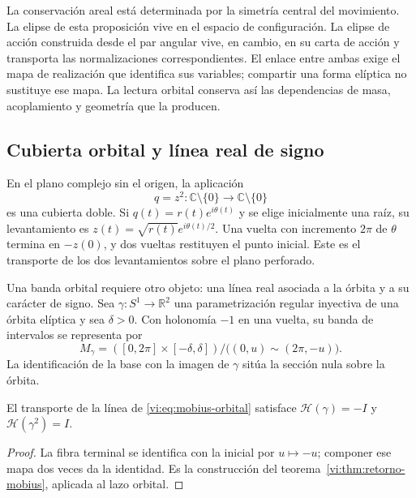 La conservación areal está determinada por la simetría central
del movimiento. La elipse de esta proposición vive en el
espacio de configuración. La elipse de acción construida
desde el par angular vive, en cambio, en su carta de acción
y transporta las normalizaciones correspondientes. El enlace
entre ambas exige el mapa de realización que identifica sus
variables; compartir una forma elíptica no sustituye ese mapa.
La lectura orbital conserva así las dependencias de masa,
acoplamiento y geometría que la producen.

\subsection{Cubierta orbital y línea real de signo}
\label{vi:subsec:cubierta-orbital}

En el plano complejo sin el origen, la aplicación
\begin{equation}
 q=z^2:\mathbb C\setminus\{0\}\longrightarrow
                 \mathbb C\setminus\{0\}
 \label{vi:eq:levi-civita}
\end{equation}
es una cubierta doble. Si $q(t)=r(t)e^{i\theta(t)}$ y se
elige inicialmente una raíz, su levantamiento es
$z(t)=\sqrt{r(t)}e^{i\theta(t)/2}$. Una vuelta con incremento
$2\pi$ de $\theta$ termina en $-z(0)$, y dos vueltas
restituyen el punto inicial. Este es el transporte de los dos
levantamientos sobre el plano perforado.

Una banda orbital requiere otro objeto: una línea real
asociada a la órbita y a su carácter de signo. Sea
$\gamma:S^1\to\mathbb R^2$ una parametrización regular
inyectiva de una órbita elíptica y sea $\delta>0$. Con
holonomía $-1$ en una vuelta, su banda de intervalos se
representa por
\begin{equation}
 M_\gamma=([0,2\pi]\times[-\delta,\delta])/
          \bigl((0,u)\sim(2\pi,-u)\bigr).
 \label{vi:eq:mobius-orbital}
\end{equation}
La identificación de la base con la imagen de $\gamma$
sitúa la sección nula sobre la órbita.

\begin{proposition}
\label{vi:prop:holonomia-orbital}
El transporte de la línea de \eqref{vi:eq:mobius-orbital}
satisface
$\mathcal H(\gamma)=-I$ y $\mathcal H(\gamma^2)=I$.
\end{proposition}
\begin{proof}
La fibra terminal se identifica con la inicial por
$u\mapsto-u$; componer ese mapa dos veces da la identidad.
Es la construcción del
teorema~\ref{vi:thm:retorno-mobius}, aplicada al lazo orbital.
\end{proof}

